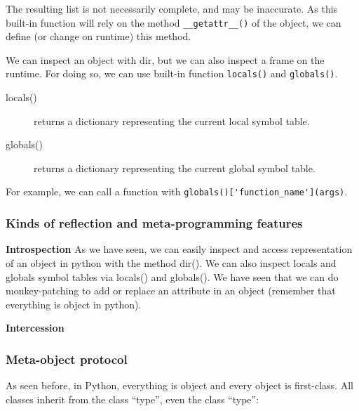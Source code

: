 \documentclass[a4paper,10pt]{article}
\begin{document}
The resulting list is not necessarily complete, and may be inaccurate. As this built-in function will rely on the method \lstinline|__getattr__()| of the object, we can define (or change on runtime) this method.

We can inspect an object with dir, but we can also inspect a frame on the runtime. For doing so, we can use built-in function \lstinline|locals()| and \lstinline|globals()|.

\begin{description}
\item[locals()] returns a dictionary representing the current local symbol table.
\item[globals()] returns a dictionary representing the current global symbol table.
\end{description}

For example, we can call a function with \lstinline|globals()['function_name'](args)|.

\subsubsection{Kinds of reflection and meta-programming features}

\textbf{Introspection}
As we have seen, we can easily inspect and access representation of an object in python with the method dir(). We can also inspect locals and globals symbol tables via locals() and globals(). We have seen that we can do monkey-patching to add or replace an attribute in an object (remember that everything is object in python). 

\textbf{Intercession}


\subsubsection{Meta-object protocol}

As seen before, in Python, everything is object and every object is first-class. All classes inherit from the class ``type'', even the class ``type'':
\end{document}
